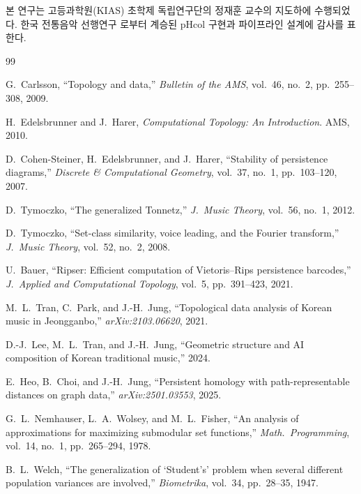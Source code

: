 \documentclass[conference,10pt,a4paper]{IEEEtran}
\begin{document}
본 연구는 고등과학원(KIAS) 초학제 독립연구단의 정재훈 교수의
지도하에 수행되었다. 한국 전통음악 선행연구 \cite{lee2024}로부터
계승된 pHcol 구현과 파이프라인 설계에 감사를 표한다.


\begin{thebibliography}{99}

G.~Carlsson, ``Topology and data,''
\emph{Bulletin of the AMS}, vol.~46, no.~2, pp.~255--308, 2009.

H.~Edelsbrunner and J.~Harer,
\emph{Computational Topology: An Introduction}. AMS, 2010.

D.~Cohen-Steiner, H.~Edelsbrunner, and J.~Harer,
``Stability of persistence diagrams,''
\emph{Discrete \& Computational Geometry}, vol.~37, no.~1,
pp.~103--120, 2007.

D.~Tymoczko, ``The generalized Tonnetz,''
\emph{J.\ Music Theory}, vol.~56, no.~1, 2012.

D.~Tymoczko, ``Set-class similarity, voice leading, and the Fourier
transform,'' \emph{J.\ Music Theory}, vol.~52, no.~2, 2008.

U.~Bauer, ``Ripser: Efficient computation of Vietoris--Rips persistence
barcodes,'' \emph{J.\ Applied and Computational Topology}, vol.~5,
pp.~391--423, 2021.

M.~L.~Tran, C.~Park, and J.-H.~Jung, ``Topological data analysis of
Korean music in Jeongganbo,'' \emph{arXiv:2103.06620}, 2021.

D.-J.~Lee, M.~L.~Tran, and J.-H.~Jung, ``Geometric structure and AI
composition of Korean traditional music,'' 2024.

E.~Heo, B.~Choi, and J.-H.~Jung, ``Persistent homology with
path-representable distances on graph data,''
\emph{arXiv:2501.03553}, 2025.

G.~L.~Nemhauser, L.~A.~Wolsey, and M.~L.~Fisher, ``An analysis of
approximations for maximizing submodular set functions,''
\emph{Math.\ Programming}, vol.~14, no.~1, pp.~265--294, 1978.

B.~L.~Welch, ``The generalization of `Student's' problem when several
different population variances are involved,''
\emph{Biometrika}, vol.~34, pp.~28--35, 1947.


\end{thebibliography}
\end{document}
